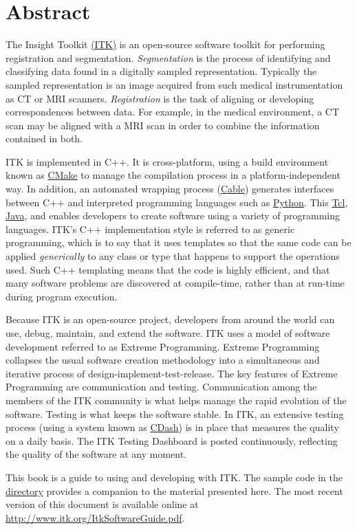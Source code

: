 \chapter*{Abstract}
\noindent
The Insight Toolkit \href{http://www.itk.org}{(ITK)} is an open-source
software toolkit for performing registration and
segmentation. \emph{Segmentation} is the process of identifying and
classifying data found in a digitally sampled
representation. Typically the sampled representation is an image
acquired from such medical instrumentation as CT or MRI
scanners. \emph{Registration} is the task of aligning or developing
correspondences between data. For example, in the medical environment,
a CT scan may be aligned with a MRI scan in order to combine the
information contained in both.

ITK is implemented in C++. It is cross-platform, using a build
environment known as \href{http://www.cmake.org}{CMake} to manage the
compilation process in a platform-independent way.
In addition, an automated wrapping process
(\href{http://public.kitware.com/Cable/HTML/Index.html}{Cable})
generates interfaces between C++ and interpreted programming languages
such as
\href{http://www.python.org}{Python}. This
\href{http://tcl.sourceforge.net}{Tcl},
\href{http://java.sun.com}{Java}, and
enables developers to create software using a variety of programming
languages. ITK's C++ implementation style is referred to as generic
programming, which is to say that it uses templates so that the same
code can be applied \emph{generically} to any class or type that
happens to support the operations used. Such C++
templating means that the code is highly efficient, and that many
software problems are discovered at compile-time, rather than at
run-time during program execution.

Because ITK is an open-source project, developers from around the
world can use, debug, maintain, and extend the software. ITK uses a
model of software development referred to as Extreme
Programming. Extreme Programming collapses the usual software creation
methodology into a simultaneous and iterative process of
design-implement-test-release. The key features of Extreme Programming
are communication and testing. Communication among the members of the
ITK community is what helps manage the rapid evolution of the
software.  Testing is what keeps the software stable. In ITK, an
extensive testing process (using a system known as
\href{http://public.kitware.com/dashboard.php?name=itk}{CDash}) is in place that
measures the quality on a daily basis. The ITK Testing Dashboard is
posted continuously, reflecting the quality of the software at any
moment.

This book is a guide to using and developing with ITK. The sample code
in the
\href{http://itk.org/gitweb?p=ITK.git}
{directory} provides a companion to the material presented here.  The
most recent version of this document is available online at
\url{http://www.itk.org/ItkSoftwareGuide.pdf}.


